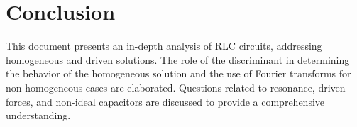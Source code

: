 \documentclass[a4paper,11pt]{article}
\begin{document}
\section*{Conclusion}
This document presents an in-depth analysis of RLC circuits, addressing homogeneous and driven solutions. The role of the discriminant in determining the behavior of the homogeneous solution and the use of Fourier transforms for non-homogeneous cases are elaborated. Questions related to resonance, driven forces, and non-ideal capacitors are discussed to provide a comprehensive understanding.
\end{document}
